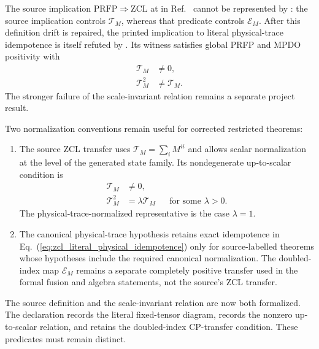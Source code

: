\documentclass{article}
\begin{document}
The source implication
$\mathrm{PRFP}\Rightarrow\mathrm{ZCL}$ at
 in
Ref.~\cite{Cirac2016MPDO_arXiv} cannot be represented by
: the source implication controls $\mathcal T_M$,
whereas that predicate controls $\mathcal E_M$. After this definition drift is
repaired, the printed implication to literal physical-trace idempotence is
itself refuted by
.
Its witness satisfies global PRFP and MPDO positivity with
\begin{align}
    \mathcal T_M
    &\ne0,
    \label{eq:zcl_prfp_witness_nonzero_transfer}\\
    \mathcal T_M^2
    &\ne\mathcal T_M.
    \label{eq:zcl_prfp_witness_not_idempotent}
\end{align}
The stronger failure of the scale-invariant relation remains a separate
project result.

Two normalization conventions remain useful for corrected restricted
theorems:
\begin{enumerate}
    \item The source ZCL transfer uses
    $\mathcal T_M=\sum_iM^{ii}$ and allows scalar normalization at the level of
    the generated state family. Its nondegenerate up-to-scalar condition is
    \begin{align}
        \mathcal T_M
        &\ne0,
        \label{eq:zcl_source_transfer_nonzero}\\
        \mathcal T_M^2
        &=\lambda\mathcal T_M
        &&\text{for some $\lambda>0$}.
        \label{eq:zcl_source_transfer_quasi_idempotence}
    \end{align}
    The physical-trace-normalized representative is the case $\lambda=1$.
    \item The canonical physical-trace hypothesis retains exact idempotence
    in Eq.~(\ref{eq:zcl_literal_physical_idempotence}) only for source-labelled
    theorems whose hypotheses include the required canonical normalization.
    The doubled-index map $\mathcal E_M$ remains a separate completely positive
    transfer used in the formal fusion and algebra statements, not the
    source's ZCL transfer.
\end{enumerate}

The source definition and the scale-invariant relation are now both
formalized. The declaration
 records the literal fixed-tensor
diagram,  records the nonzero up-to-scalar
relation, and  retains the doubled-index CP-transfer
condition. These predicates must remain distinct.
\end{document}
